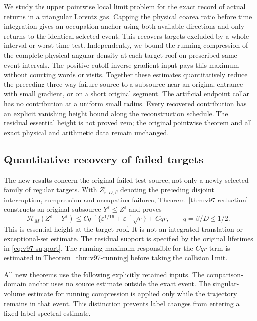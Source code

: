 \documentclass[11pt,reqno]{amsart}
\numberwithin{equation}{section}
\theoremstyle{definition}\newtheorem{definition}[theorem]{Definition}
\theoremstyle{remark}\newtheorem{remark}[theorem]{Remark}
\theoremstyle{definition}\newtheorem{inputstatement}[theorem]{Input statement}
\begin{document}
We study the upper pointwise local limit problem for the exact record
of actual returns in a triangular Lorentz gas. Capping the physical
coarea ratio before time integration gives an occupation anchor using
both available directions and only returns to the identical selected
event. This recovers targets excluded by a whole-interval or worst-time
test. Independently, we bound the running compression of the complete
physical angular density at each target roof on prescribed same-event
intervals. The positive-cutoff inverse-gradient input pays this maximum
without counting words or visits. Together these estimates quantitatively
reduce the preceding three-way failure source to a subsource near an
original entrance with small gradient, or on a short original segment.
The artificial endpoint collar has no contribution at a uniform small
radius. Every recovered contribution has an explicit vanishing height
bound along the reconstruction schedule. The residual essential height
is not proved zero; the original pointwise theorem and all exact physical
and arithmetic data remain unchanged.




\subsection{Quantitative recovery of failed targets}
The new results concern the original failed-test source, not only a
newly selected family of regular targets. With $Z_{r,D,\beta}^\varepsilon$
denoting the preceding disjoint interruption, compression and
occupation failures, Theorem~\ref{thm:v97-reduction} constructs an
original subsource $Y^\varepsilon\le Z^\varepsilon$ and proves
\[
 \mathcal H_M(Z^\varepsilon-Y^\varepsilon)
 \le Cq^{-1}\{\varepsilon^{1/16}+\varepsilon^{-1}\sqrt r\}+Cqr,
 \qquad q=\beta/D\le1/2.
\]
This is essential height at the target roof. It is not an integrated
translation or exceptional-set estimate. The residual support is
specified by the original lifetimes in \eqref{eq:v97-support}.
The running maximum responsible for the $Cqr$ term is estimated in
Theorem~\ref{thm:v97-running} before taking the collision limit.

All new theorems use the following explicitly retained inputs. The
comparison-domain anchor uses no source estimate outside the exact
event. The singular-volume estimate for running compression is applied
only while the trajectory remains in that event. This distinction
prevents label changes from entering a fixed-label spectral estimate.
\end{document}
